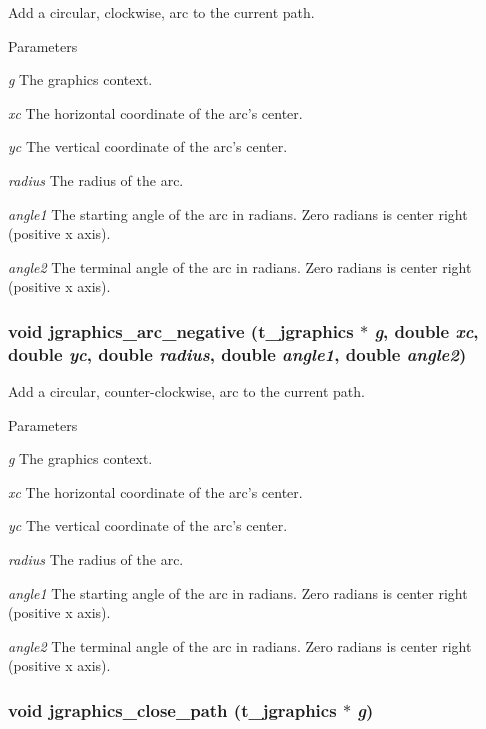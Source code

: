 Add a circular, clockwise, arc to the current path. 
\begin{DoxyParams}{Parameters}
\item[{\em g}]The graphics context. \item[{\em xc}]The horizontal coordinate of the arc's center. \item[{\em yc}]The vertical coordinate of the arc's center. \item[{\em radius}]The radius of the arc. \item[{\em angle1}]The starting angle of the arc in radians. Zero radians is center right (positive x axis). \item[{\em angle2}]The terminal angle of the arc in radians. Zero radians is center right (positive x axis). \end{DoxyParams}
\hypertarget{group__jgraphics_gaafd9fedb4ec2870714890120ae1c353d}{
\subsubsection[{jgraphics\_\-arc\_\-negative}]{\setlength{\rightskip}{0pt plus 5cm}void jgraphics\_\-arc\_\-negative ({\bf t\_\-jgraphics} $\ast$ {\em g}, \/  double {\em xc}, \/  double {\em yc}, \/  double {\em radius}, \/  double {\em angle1}, \/  double {\em angle2})}}
\label{group__jgraphics_gaafd9fedb4ec2870714890120ae1c353d}


Add a circular, counter-\/clockwise, arc to the current path. 
\begin{DoxyParams}{Parameters}
\item[{\em g}]The graphics context. \item[{\em xc}]The horizontal coordinate of the arc's center. \item[{\em yc}]The vertical coordinate of the arc's center. \item[{\em radius}]The radius of the arc. \item[{\em angle1}]The starting angle of the arc in radians. Zero radians is center right (positive x axis). \item[{\em angle2}]The terminal angle of the arc in radians. Zero radians is center right (positive x axis). \end{DoxyParams}
\hypertarget{group__jgraphics_ga22cf905279b642358789ae7ed133808f}{
\subsubsection[{jgraphics\_\-close\_\-path}]{\setlength{\rightskip}{0pt plus 5cm}void jgraphics\_\-close\_\-path ({\bf t\_\-jgraphics} $\ast$ {\em g})}}
\label{group__jgraphics_ga22cf905279b642358789ae7ed133808f}


